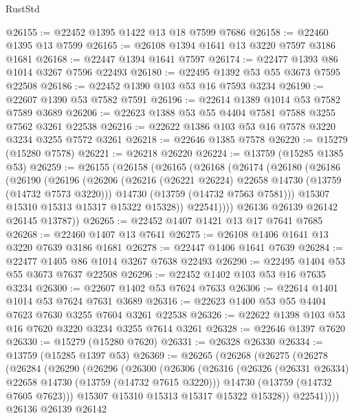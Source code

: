 \begin{lexlean}{RustStd}
\begin{coremodule}
@26155 := @22452 @1395 @1422 @13 @18 @7599 @7686
@26158 := @22460 @1395 @13 @7599
@26165 := @26108 @1394 @1641 @13 @3220 @7597 @3186 @1681
@26168 := @22447 @1394 @1641 @7597
@26174 := @22477 @1393 @86 @1014 @3267 @7596 @22493
@26180 := @22495 @1392 @53 @55 @3673 @7595 @22508
@26186 := @22452 @1390 @103 @53 @16 @7593 @3234
@26190 := @22607 @1390 @53 @7582 @7591
@26196 := @22614 @1389 @1014 @53 @7582 @7589 @3689
@26206 := @22623 @1388 @53 @55 @4404 @7581 @7588 @3255 @7562 @3261 @22538
@26216 := @22622 @1386 @103 @53 @16 @7578 @3220 @3234 @3255 @7572 @3261
@26218 := @22646 @1385 @7578
@26220 := @15279 (@15280 @7578)
@26221 := @26218 @26220
@26224 := @13759 (@15285 @1385 @53)
@26259 := @26155
    (@26158
      (@26165
        (@26168
          (@26174
            (@26180
              (@26186
                (@26190
                  (@26196
                    (@26206
                      (@26216 (@26221 @26224) @22658 @14730 (@13759 (@14732 @7573 @3220)))
                      @14730
                      (@13759 (@14732 @7563 @7581)))
                    @15307
                    @15310
                    @15313
                    @15317
                    @15322
                    @15328))
                @22541))))
        @26136
        @26139
        @26142
        @26145
        @13787))
@26265 := @22452 @1407 @1421 @13 @17 @7641 @7685
@26268 := @22460 @1407 @13 @7641
@26275 := @26108 @1406 @1641 @13 @3220 @7639 @3186 @1681
@26278 := @22447 @1406 @1641 @7639
@26284 := @22477 @1405 @86 @1014 @3267 @7638 @22493
@26290 := @22495 @1404 @53 @55 @3673 @7637 @22508
@26296 := @22452 @1402 @103 @53 @16 @7635 @3234
@26300 := @22607 @1402 @53 @7624 @7633
@26306 := @22614 @1401 @1014 @53 @7624 @7631 @3689
@26316 := @22623 @1400 @53 @55 @4404 @7623 @7630 @3255 @7604 @3261 @22538
@26326 := @22622 @1398 @103 @53 @16 @7620 @3220 @3234 @3255 @7614 @3261
@26328 := @22646 @1397 @7620
@26330 := @15279 (@15280 @7620)
@26331 := @26328 @26330
@26334 := @13759 (@15285 @1397 @53)
@26369 := @26265
    (@26268
      (@26275
        (@26278
          (@26284
            (@26290
              (@26296
                (@26300
                  (@26306
                    (@26316
                      (@26326 (@26331 @26334) @22658 @14730 (@13759 (@14732 @7615 @3220)))
                      @14730
                      (@13759 (@14732 @7605 @7623)))
                    @15307
                    @15310
                    @15313
                    @15317
                    @15322
                    @15328))
                @22541))))
        @26136
        @26139
        @26142

\end{coremodule}
\end{lexlean}
